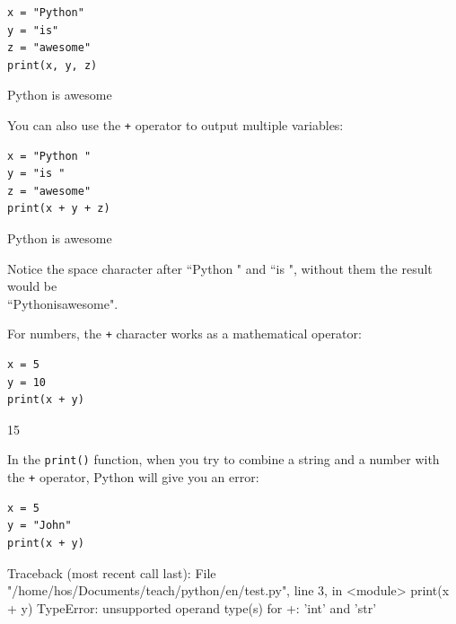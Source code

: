 \documentclass[12pt,a4paper]{article}
\newcommand{\code}[1]{%
	\colorbox{backcolour}{\lstinline{#1}}%
}
\begin{document}
\begin{ebox}
	\begin{lstlisting}
x = "Python"
y = "is"
z = "awesome"
print(x, y, z)
	\end{lstlisting}
\tcblower
	\begin{vercode}
Python is awesome
	\end{vercode}
\end{ebox}

You can also use the \code{+} operator to output multiple variables:

\begin{ebox}
	\begin{lstlisting}
x = "Python "
y = "is "
z = "awesome"
print(x + y + z)
	\end{lstlisting}
\tcblower
	\begin{vercode}
Python is awesome
	\end{vercode}
\end{ebox}

\begin{nbox}
	Notice the space character after ``Python " and ``is ", without them the
	result would be \\ ``Pythonisawesome".
\end{nbox}

For numbers, the \code{+} character works as a mathematical operator:

\begin{ebox}
	\begin{lstlisting}
x = 5
y = 10
print(x + y)
	\end{lstlisting}
\tcblower
	\begin{vercode}
15
	\end{vercode}
\end{ebox}

In the \code{print()} function, when you try to combine a string and a number with the
\code{+} operator, Python will give you an error:

\begin{abox}
	\begin{lstlisting}
x = 5
y = "John"
print(x + y)
	\end{lstlisting}
\tcblower
	\begin{vercode}
Traceback (most recent call last):
  File "/home/hos/Documents/teach/python/en/test.py",
  line 3, in <module>
    print(x + y)
TypeError: unsupported operand type(s) for +: 'int' and 'str'
	\end{vercode}
\end{abox}
\end{document}

